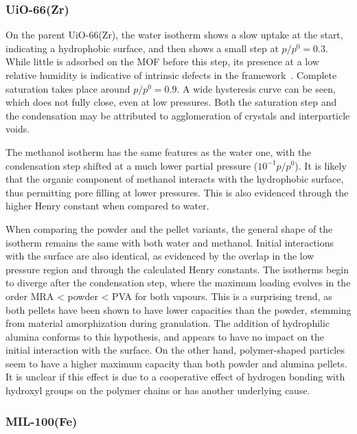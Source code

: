 \subsubsection{UiO-66(Zr)}

On the parent UiO-66(Zr), the water isotherm shows a slow uptake 
at the start, indicating a hydrophobic surface, and then shows 
a small step at \(p/p^0 = 0.3\). While little is 
adsorbed on the \gls{MOF} before this step, its presence 
at a low relative humidity is indicative of intrinsic defects
in the framework~\cite{ghoshWaterAdsorptionUiO662014}.
Complete saturation takes place around \(p/p^0 = 0.9\). 
A wide hysteresis curve can be seen, which 
does not fully close, even at low pressures. Both the
saturation step and the condensation may be attributed 
to agglomeration of crystals and interparticle voids.

The methanol isotherm has the same features as the water
one, with the condensation step shifted at a much lower 
partial pressure (\(10^{-1} p/p^0\)). It is likely that
the organic component of methanol interacts with the
hydrophobic surface, thus permitting pore filling at
lower pressures. This is also evidenced through the higher
Henry constant when compared to water.

When comparing the powder and the pellet variants, the 
general shape of the isotherm remains the same with both
water and methanol. Initial interactions with the surface are also
identical, as evidenced by the overlap in the low pressure region
and through the calculated Henry constants. The isotherms 
begin to diverge after the condensation step, where the 
maximum loading evolves in the order \gls{MRA} < powder < \gls{PVA}
for both vapours. This is a surprising trend, as both pellets
have been shown to have lower capacities than the powder,
stemming from material amorphization during granulation.
The addition of hydrophilic alumina conforms to this hypothesis,
and appears to have no impact on the initial interaction with 
the surface. On the other hand, polymer-shaped particles
seem to have a higher maximum capacity than both powder and 
alumina pellets. It is unclear if this effect is due to a 
cooperative effect of hydrogen bonding with hydroxyl groups 
on the polymer chains or has another underlying cause.


\subsubsection{MIL-100(Fe)}

